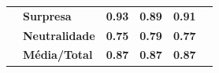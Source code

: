 \begin{table}[]
\begin{tabular}{llcccc}
                                       & \textbf{Surpresa}     & \textbf{0.93}                & \textbf{0.89}                 & \textbf{0.91}                &                                \\
                                       & \textbf{Neutralidade} & \textbf{0.75}                & \textbf{0.79}                 & \textbf{0.77}                &                                \\
                                       & \textbf{Média/Total}  & \textbf{0.87}                & \textbf{0.87}                 & \textbf{0.87}                &                                \\ \hline
\end{tabular}
\end{table}


